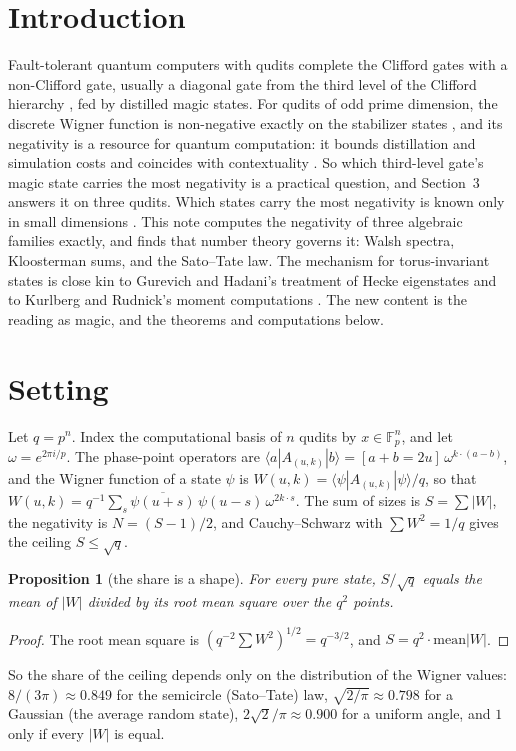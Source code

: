 \documentclass[11pt]{article}
\newtheorem{proposition}{Proposition}
\theoremstyle{remark}
\newcommand{\F}{\mathbb{F}}
\begin{document}
\section{Introduction}
Fault-tolerant quantum computers with qudits complete the Clifford gates with a non-Clifford gate, usually a
diagonal gate from the third level of the Clifford hierarchy \cite{CGK2017}, fed by distilled magic states. For
qudits of odd prime dimension, the discrete Wigner function is non-negative exactly on the stabilizer states
\cite{Gross2006}, and its negativity is a resource for quantum computation: it bounds distillation and simulation
costs and coincides with contextuality \cite{Veitch2012,Veitch2014,Howard2014}. So which third-level gate's magic
state carries the most negativity is a practical question, and Section~3 answers it on three qudits. Which states carry the most negativity
is known only in small dimensions \cite{JainPrakash2020,Erew2025}. This note computes the negativity of three algebraic
families exactly, and finds that number theory governs it: Walsh spectra, Kloosterman sums, and the Sato--Tate law.
The mechanism for torus-invariant states is close kin to Gurevich and Hadani's treatment of Hecke eigenstates
\cite{GurevichHadani,GHS2008} and to Kurlberg and Rudnick's moment computations \cite{KurlbergRudnick2005}. The new
content is the reading as magic, and the theorems and computations below.

\section{Setting}
Let $q=p^n$. Index the computational basis of $n$ qudits by $x\in\F_p^n$, and let $\omega=e^{2\pi i/p}$. The
phase-point operators are $\langle a|A_{(u,k)}|b\rangle=[a+b=2u]\,\omega^{k\cdot(a-b)}$, and the Wigner function of a
state $\psi$ is $W(u,k)=\langle\psi|A_{(u,k)}|\psi\rangle/q$, so that
$W(u,k)=q^{-1}\sum_s \overline{\psi(u+s)}\,\psi(u-s)\,\omega^{2k\cdot s}$. The sum of sizes is $S=\sum|W|$, the
negativity is $N=(S-1)/2$, and Cauchy--Schwarz with $\sum W^2=1/q$ gives the ceiling $S\le\sqrt q$.

\begin{proposition}[the share is a shape]
For every pure state, $S/\sqrt q$ equals the mean of $|W|$ divided by its root mean square over the $q^2$ points.
\end{proposition}
\begin{proof}
The root mean square is $(q^{-2}\sum W^2)^{1/2}=q^{-3/2}$, and $S=q^2\cdot\mathrm{mean}|W|$.
\end{proof}
So the share of the ceiling depends only on the distribution of the Wigner values: $8/(3\pi)\approx0.849$ for the
semicircle (Sato--Tate) law, $\sqrt{2/\pi}\approx0.798$ for a Gaussian (the average random state), $2\sqrt2/\pi\approx0.900$
for a uniform angle, and $1$ only if every $|W|$ is equal.
\end{document}
